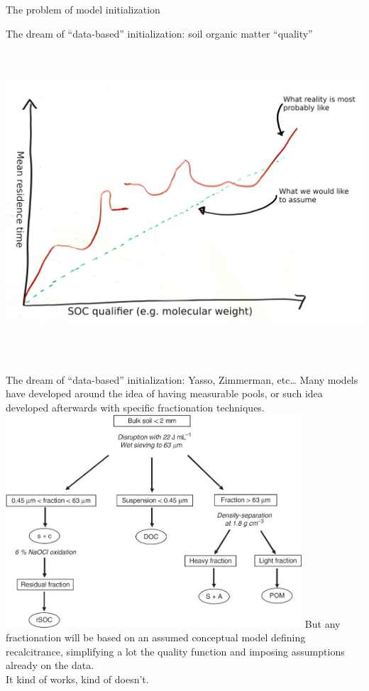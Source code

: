 \documentclass[
  ignorenonframetext,
]{beamer}
\begin{document}
\begin{frame}{The problem of model initialization}
\protect\hypertarget{the-problem-of-model-initialization}{}
\end{frame}

\begin{frame}{The dream of ``data-based'' initialization: soil organic
matter ``quality''}
\protect\hypertarget{the-dream-of-data-based-initialization-soil-organic-matter-quality}{}
\includegraphics[width=\textwidth,height=4.6875in]{quality.jpg}
\end{frame}

\begin{frame}{The dream of ``data-based'' initialization: Yasso,
Zimmerman, etc\ldots{}}
\protect\hypertarget{the-dream-of-data-based-initialization-yasso-zimmerman-etc}{}
Many models have developed around the idea of having measurable pools,
or such idea developed afterwards with specific fractionation
techniques.
\includegraphics[width=\textwidth,height=3.125in]{zimmerman.jpg} But any
fractionation will be based on an assumed conceptual model defining
recalcitrance, simplifying a lot the quality function and imposing
assumptions already on the data.\\
It kind of works, kind of doesn't.
\end{frame}
\end{document}
